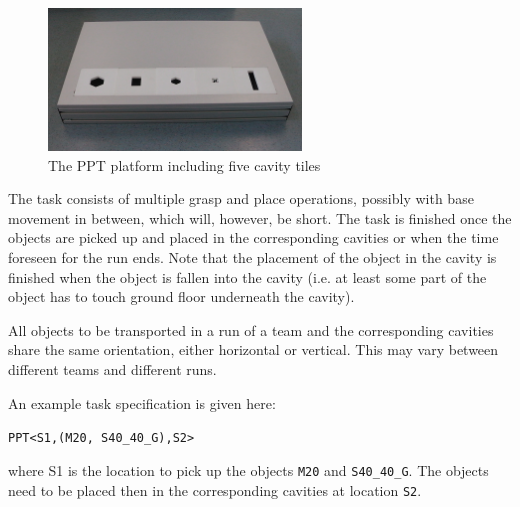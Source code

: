 \begin{figure}
\centering
\includegraphics[width=0.6\textwidth ]{./images/ppt_plattform.jpg}
\caption{The PPT platform including five cavity tiles}
\label{fig:ppt_plattform}
\end{figure}

The task consists of multiple grasp and place operations, possibly with base movement in between, which will, however, be short. The task is finished once the objects are picked up and placed in the corresponding cavities or when the time foreseen for the run ends. Note that the placement of the object in the cavity is finished when the object is fallen into the cavity (i.e. at least some part of the object has to touch ground floor underneath the cavity).
\par
All objects to be transported in a run of a team and the corresponding cavities share the same orientation, either horizontal or vertical. This may vary between different teams and different runs.
\par
An example task specification is given here:
\begin{center}
\texttt{PPT\textless S1,(M20, S40\_40\_G),S2\textgreater}
\end{center}
where S1 is the location to pick up the objects \texttt{M20} and \texttt{S40\_40\_G}. The objects need to be placed then in the corresponding cavities at location \texttt{S2}.
%
%
%

